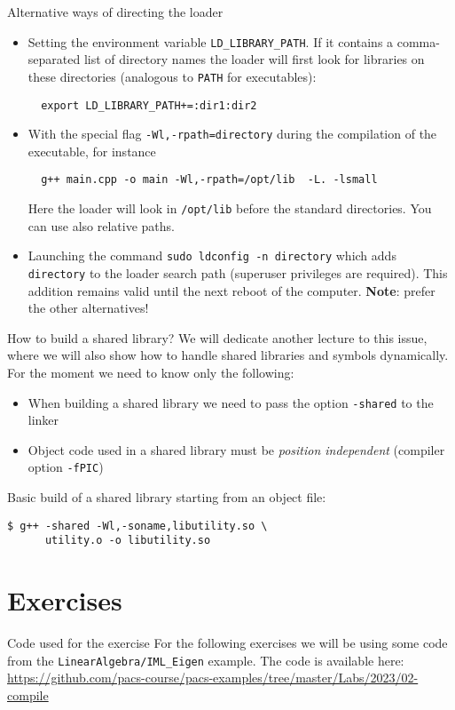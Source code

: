 \documentclass[10pt,aspectratio=169]{beamer}
\begin{document}
\begin{frame}[fragile]{Alternative ways of directing the loader}
  \begin{itemize}
  \item Setting the environment variable \texttt{LD\_LIBRARY\_PATH}. If
    it contains a comma-separated list of directory names the
    loader will first look for libraries on these directories (analogous to \texttt{PATH} for executables):
\begin{verbatim}
  export LD_LIBRARY_PATH+=:dir1:dir2
\end{verbatim}
\item With the special flag \texttt{-Wl,-rpath=directory}
  during the compilation of the executable, for instance
\begin{verbatim}
  g++ main.cpp -o main -Wl,-rpath=/opt/lib  -L. -lsmall
\end{verbatim}
Here the loader will look in \texttt{/opt/lib} before the standard directories. You can use also relative paths.
\item Launching the command \texttt{sudo ldconfig -n directory} which adds \texttt{directory} to the loader search path (superuser privileges are required). This addition remains valid until the next reboot of the computer. \textbf{Note}: prefer the other alternatives!
  \end{itemize}
\end{frame}

\begin{frame}[fragile]{How to build a shared library?}
  We will dedicate another lecture to this issue, where we will also show how to handle shared libraries and symbols dynamically.
  For the moment we need to know only the following:
  \begin{itemize}
  \item When building a shared library we need to pass the option \texttt{-shared} to the linker
  \item Object code used in a shared library must be \emph{position independent} (compiler option \texttt{-fPIC})
  \end{itemize}

  Basic build of a shared library starting from an object file:
\begin{verbatim}
$ g++ -shared -Wl,-soname,libutility.so \
      utility.o -o libutility.so
\end{verbatim}
\end{frame}


\section{Exercises}
\begin{frame}{Code used for the exercise}
  For the following exercises we will be using some code from the \texttt{LinearAlgebra/IML\_Eigen} example.
  \vfill
  The code is available here: \url{https://github.com/pacs-course/pacs-examples/tree/master/Labs/2023/02-compile}
\end{frame}
\end{document}
